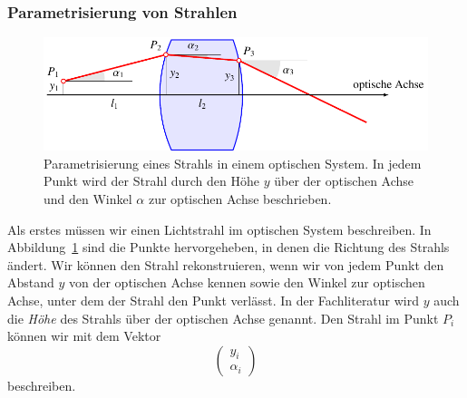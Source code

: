 \subsubsection{Parametrisierung von Strahlen}
\begin{figure}
\centering
\includegraphics{applications/matrixoptik/ray.pdf}
\caption{Parametrisierung eines Strahls in einem optischen System.
In jedem Punkt wird der Strahl durch den Höhe $y$ über der optischen
Achse und den Winkel $\alpha$ zur optischen Achse beschrieben.
\label{mo:ray}}
\end{figure}
Als erstes müssen wir einen Lichtstrahl im optischen System beschreiben.
In Abbildung~\ref{mo:ray} sind die Punkte hervorgeheben, in denen
die Richtung des Strahls ändert.
Wir können den Strahl rekonstruieren, wenn wir von jedem Punkt den
Abstand $y$ von der optischen Achse kennen sowie den Winkel zur
optischen Achse, unter dem der Strahl den Punkt verlässt.
In der Fachliteratur wird $y$ auch die {\em Höhe} des Strahls über
der optischen Achse genannt.
Den Strahl im Punkt $P_i$ können wir mit dem Vektor
\[
\begin{pmatrix}
y_i\\\alpha_i
\end{pmatrix}
\]
beschreiben.

